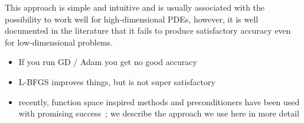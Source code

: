 This approach is simple and intuitive and is usually associated with the possibility to work well for high-dimensional PDEs, however, it is well documented in the literature that it fails to produce satisfactory accuracy even for low-dimensional problems. 

\begin{itemize}
    \item If you run GD / Adam you get no good accuracy~\cite{?}
    \item L-BFGS improves things, but is not super satisfactory
    \item recently, function space inspired methods and preconditioners have been used with promising success~\cite[text]{CPINNs, ENG, preconditioning?, FS paper, Navier-Stokes}; we describe the approach we use here in more detail 
\end{itemize}

